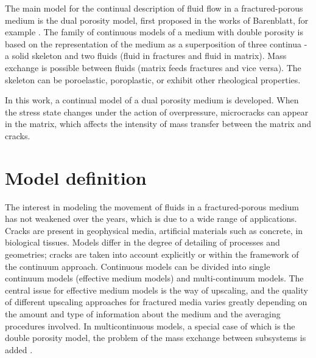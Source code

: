 \documentclass[article,authoryear,jpm]{beg_39}             %
\begin{document}
The main model for the continual description of fluid flow in a fractured-porous medium is the dual porosity model, first proposed in the works of Barenblatt, for example \cite{Barenblatt}. The family of continuous models of a medium with double porosity is based on the representation of the medium as a superposition of three continua - a solid skeleton and two fluids (fluid in fractures and fluid in matrix). Mass exchange is possible between fluids (matrix feeds fractures and vice versa). The skeleton can be poroelastic, poroplastic, or exhibit other rheological properties.

In this work, a continual model of a dual porosity medium is developed. When the stress state changes under the action of overpressure, microcracks can appear in the matrix, which affects the intensity of mass transfer between the matrix and cracks.

\section{Model definition}
\label{sec:1}
The interest in modeling the movement of fluids in a fractured-porous medium has not weakened over the years, which is due to a wide range of applications. Cracks are present in geophysical media, artificial materials such as concrete, in biological tissues. Models differ in the degree of detailing of processes and geometries; cracks are taken into account explicitly or within the framework of the continuum approach. Continuous models can be divided into single continuum models (effective medium models) and multi-continuum models. The central issue for effective medium models is the way of upscaling, and the quality of different upscaling approaches for fractured media varies greatly depending on the amount and type of information about the medium and the averaging procedures involved. In multicontinuous models, a special case of which is the double porosity model, the problem of the mass exchange between subsystems is added \cite{Berre}.
\end{document}
